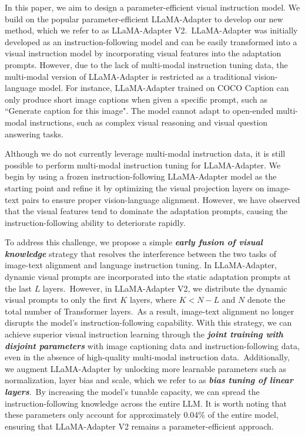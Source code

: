 \documentclass[10pt,twocolumn,letterpaper]{article}
\begin{document}
In this paper, we aim to design a parameter-efficient visual instruction model. We build on the popular parameter-efficient LLaMA-Adapter to develop our new method, which we refer to as LLaMA-Adapter V2.~LLaMA-Adapter was initially developed as an instruction-following model and can be easily transformed into a visual instruction model by incorporating visual features into the adaptation prompts. However, due to the lack of multi-modal instruction tuning data, the multi-modal version of LLaMA-Adapter is restricted as a traditional vision-language model. For instance, LLaMA-Adapter trained on COCO Caption \cite{chen2015microsoft} can only produce short image captions when given a specific prompt, such as ``Generate caption for this image". The model cannot adapt to open-ended multi-modal instructions, such as complex visual reasoning and visual question answering tasks.



Although we do not currently leverage multi-modal instruction data, it is still possible to perform multi-modal instruction tuning for LLaMA-Adapter. We begin by using a frozen instruction-following LLaMA-Adapter model as the starting point and refine it by optimizing the visual projection layers on image-text pairs to ensure proper vision-language alignment. However, we have observed that the visual features tend to dominate the adaptation prompts, causing the instruction-following ability to deteriorate rapidly.

To address this challenge, we propose a simple \textbf{\textit{early fusion of visual knowledge}} strategy that resolves the interference between the two tasks of image-text alignment and language instruction tuning. In LLaMA-Adapter, dynamic visual prompts are incorporated into the static adaptation prompts at the last $L$ layers.~However, in LLaMA-Adapter V2, we distribute the dynamic visual prompts to only the first $K$ layers, where $K<N-L$ and $N$ denote the total number of Transformer layers.~As a result, image-text alignment no longer disrupts the model's instruction-following capability. 
With this strategy, we can achieve superior visual instruction learning through the \textbf{\textit{joint training with disjoint parameters}} with image captioning data and instruction-following data, even in the absence of high-quality multi-modal instruction data.~Additionally, we augment LLaMA-Adapter by unlocking more learnable parameters such as normalization, layer bias and scale, which we refer to as \textbf{\textit{bias tuning of linear layers}}.~By increasing the model's tunable capacity, we can spread the instruction-following knowledge across the entire LLM. It is worth noting that these parameters only account for approximately 0.04\% of the entire model, ensuring that LLaMA-Adapter V2 remains a parameter-efficient approach.
\end{document}
